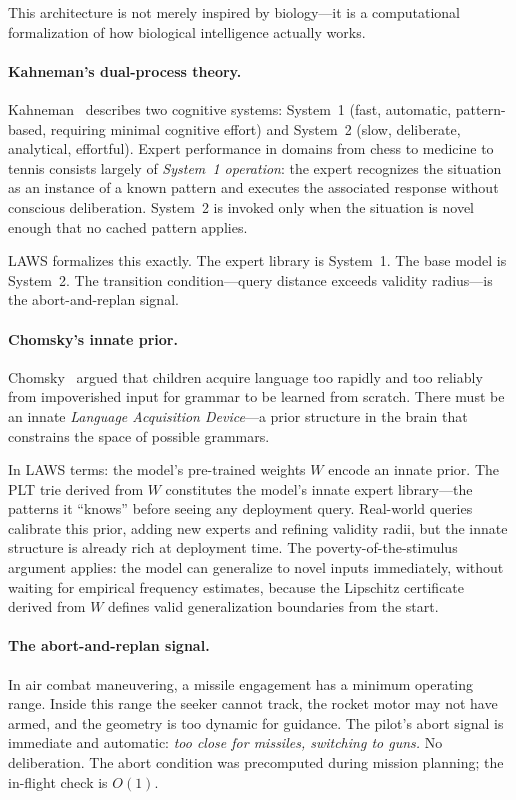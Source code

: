 \documentclass[11pt]{article}
\begin{document}
This architecture is not merely inspired by biology---it is a computational
formalization of how biological intelligence actually works.

\paragraph{Kahneman's dual-process theory.}
Kahneman~\cite{kahneman2011} describes two cognitive systems: System~1 (fast,
automatic, pattern-based, requiring minimal cognitive effort) and System~2
(slow, deliberate, analytical, effortful).  Expert performance in domains from
chess to medicine to tennis consists largely of \emph{System~1 operation}: the
expert recognizes the situation as an instance of a known pattern and executes
the associated response without conscious deliberation.  System~2 is invoked
only when the situation is novel enough that no cached pattern applies.

LAWS formalizes this exactly.  The expert library is System~1.  The base model
is System~2.  The transition condition---query distance exceeds validity
radius---is the abort-and-replan signal.

\paragraph{Chomsky's innate prior.}
Chomsky~\cite{chomsky1965} argued that children acquire language too rapidly and
too reliably from impoverished input for grammar to be learned from scratch.
There must be an innate \emph{Language Acquisition Device}---a prior structure
in the brain that constrains the space of possible grammars.

In LAWS terms: the model's pre-trained weights $W$ encode an innate prior.  The
PLT trie derived from $W$ constitutes the model's innate expert library---the
patterns it ``knows'' before seeing any deployment query.  Real-world queries
calibrate this prior, adding new experts and refining validity radii, but the
innate structure is already rich at deployment time.  The poverty-of-the-stimulus
argument applies: the model can generalize to novel inputs immediately, without
waiting for empirical frequency estimates, because the Lipschitz certificate
derived from $W$ defines valid generalization boundaries from the start.

\paragraph{The abort-and-replan signal.}
In air combat maneuvering, a missile engagement has a minimum operating range.
Inside this range the seeker cannot track, the rocket motor may not have armed,
and the geometry is too dynamic for guidance.  The pilot's abort signal is
immediate and automatic: \emph{too close for missiles, switching to guns.}  No
deliberation.  The abort condition was precomputed during mission planning; the
in-flight check is $O(1)$.
\end{document}
